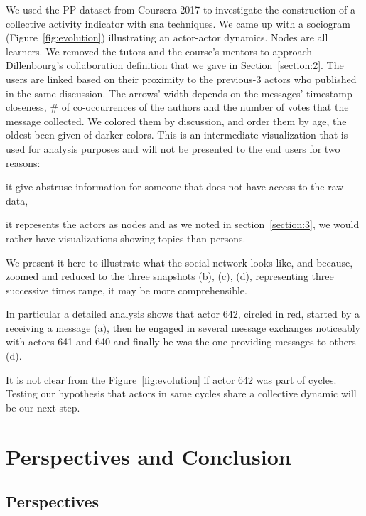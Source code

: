 \documentclass[a4paper,twoside]{article}
\begin{document}
We used the PP dataset from Coursera 2017 to investigate the construction of a collective activity indicator with \gls{sna} techniques.  We came up with a sociogram (Figure~\ref{fig:evolution}) illustrating an actor-actor dynamics.  Nodes are all learners.  We removed the tutors and the course's mentors to approach Dillenbourg's collaboration definition that we gave in Section~\ref{section:2}.  The users are linked based on their proximity to the previous-3 actors who published in the same discussion.  The arrows' width depends on the messages' timestamp closeness, \# of co-occurrences of the authors and the number of votes that the message collected.  We colored them by discussion, and order them by age, the oldest been given of darker colors.  This is an intermediate visualization that is used for analysis purposes and will not be presented to the end users for two reasons:
\begin{inparaenum}
\item it give abstruse information for someone that does not have access to the raw data,
\item it represents the actors as nodes and as we noted in section~\ref{section:3}, we would rather have visualizations showing topics than persons.
\end{inparaenum}
We present it here to illustrate what the social network looks like, and because, zoomed and reduced to the three snapshots (b), (c), (d), representing three successive times range, it may be more comprehensible.

In particular a detailed analysis shows that actor 642, circled in red, started by a receiving a message (a), then he engaged in several message exchanges noticeably with actors 641 and 640 and finally he was the one providing messages to others (d).

It is not clear from the Figure~\ref{fig:evolution} if actor 642 was part of cycles.  Testing our hypothesis that actors in same cycles share a collective dynamic will be our next step.

\section{Perspectives and Conclusion}
\label{section:6}


\subsection{Perspectives}
\end{document}
